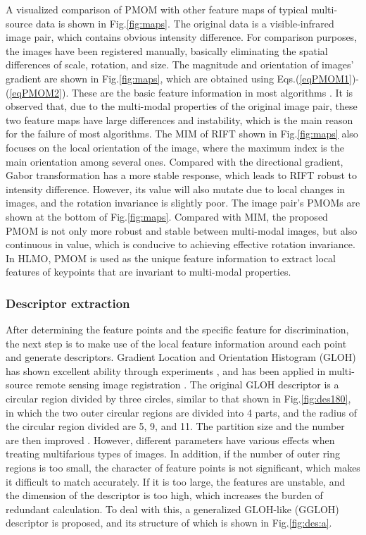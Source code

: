 A visualized comparison of PMOM with other feature maps of typical multi-source data is shown in Fig.\ref{fig:maps}. The original data is a visible-infrared image pair, which contains obvious intensity difference. For comparison purposes, the images have been registered manually, basically eliminating the spatial differences of scale, rotation, and size. The magnitude and orientation of images' gradient are shown in Fig.\ref{fig:maps}, which are obtained using Eqs.(\ref{eqPMOM1})-(\ref{eqPMOM2}). These are the basic feature information in most algorithms \cite{lowe2004distinctive,dalal2005histograms,bay2006surf,chen2010partial,2021Multi}. It is observed that, due to the multi-modal properties of the original image pair, these two feature maps have large differences and instability, which is the main reason for the failure of most algorithms. The MIM \cite{li2019rift} of RIFT shown in Fig.\ref{fig:maps} also focuses on the local orientation of the image, where the maximum index is the main orientation among several ones. Compared with the directional gradient, Gabor transformation has a more stable response, which leads to RIFT robust to intensity difference. However, its value will also mutate due to local changes in images, and the rotation invariance is slightly poor. The image pair's PMOMs are shown at the bottom of Fig.\ref{fig:maps}. Compared with MIM, the proposed PMOM is not only more robust and stable between multi-modal images, but also continuous in value, which is conducive to achieving effective rotation invariance. In HLMO, PMOM is used as the unique feature information to extract local features of keypoints that are invariant to multi-modal properties.


\subsubsection{Descriptor extraction}

After determining the feature points and the specific feature for discrimination, the next step is to make use of the local feature information around each point and generate descriptors. Gradient Location and Orientation Histogram (GLOH) has shown excellent ability through experiments \cite{mikolajczyk2005performance}, and has been applied in multi-source remote sensing image registration \cite{dellinger2014sar,ma2016remote}. The original GLOH descriptor is a circular region divided by three circles, similar to that shown in Fig.\ref{fig:des180}, in which the two outer circular regions are divided into 4 parts, and the radius of the circular region divided are 5, 9, and 11. The partition size and the number are then improved \cite{mikolajczyk2005performance,dellinger2014sar,ma2016remote}. However, different parameters have various effects when treating multifarious types of images. In addition, if the number of outer ring regions is too small, the character of feature points is not significant, which makes it difficult to match accurately. If it is too large, the features are unstable, and the dimension of the descriptor is too high, which increases the burden of redundant calculation. To deal with this, a generalized GLOH-like (GGLOH) descriptor is proposed, and its structure of which is shown in Fig.\ref{fig:des:a}.

